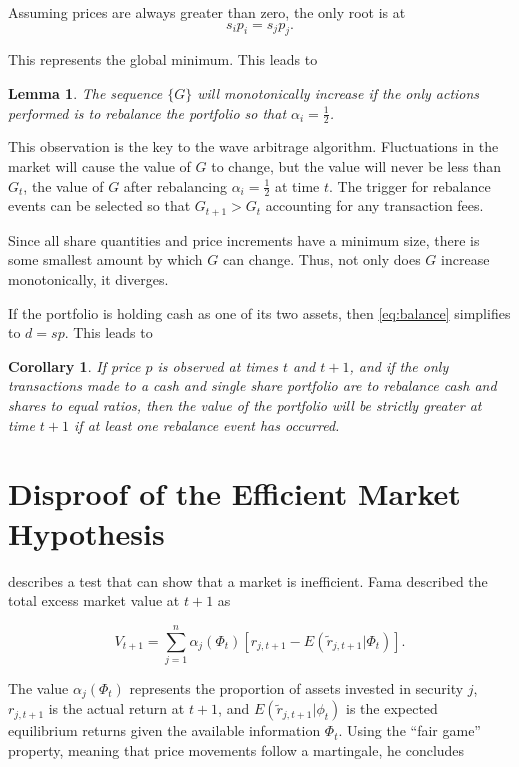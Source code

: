 \documentclass{article}
\newtheorem{corollary}{Corollary}
\newtheorem{lemma}{Lemma}
\begin{document}
Assuming prices are always greater than zero, the only root is at
\begin{equation}
\label{eq:balance}
  s_i p_i = s_j p_j .
\end{equation}

This represents the global minimum. This leads to

\begin{lemma}
\label{lemma}
  The sequence $\{G\}$ will monotonically increase if the only actions performed
  is to rebalance the portfolio so that $\alpha_i = \frac{1}{2}$.
\end{lemma}

This observation is the key to the wave arbitrage algorithm. Fluctuations in the
market will cause the value of $G$ to change, but the value will never be less
than $G_t$, the value of $G$ after rebalancing $\alpha_i = \frac{1}{2}$ at
time $t$. The trigger for rebalance events can be selected so that
$G_{t+1} > G_t$ accounting for any transaction fees.

Since all share quantities and price increments have a minimum size, there is
some smallest amount by which $G$ can change. Thus, not only does $G$ increase
monotonically, it diverges.

If the portfolio is holding cash as one of its two assets, then
\ref{eq:balance} simplifies to $d = s p$. This leads to

\begin{corollary}
  If price $p$ is observed at times $t$ and $t+1$, and if the only
  transactions made to a cash and single share portfolio are to rebalance cash
  and shares to equal ratios, then the value of the portfolio will be strictly
  greater at time $t + 1$ if at least one rebalance event has occurred.
\end{corollary}

\section{Disproof of the Efficient Market Hypothesis}
\label{sec:disproof}

\citet{fama1970} describes a test that can show that a market is
inefficient. Fama described the total excess market value at $t+1$ as

\begin{equation}
  V_{t+1}
    = \sum_{j=1}^n \alpha_j (\Phi_t) [ r_{j,t+1} - E(\tilde{r}_{j,t+1} | \Phi_t)].
\end{equation}

The value $\alpha_j (\Phi_t)$ represents the proportion of assets invested in
security $j$, $r_{j,t+1}$ is the actual return at $t+1$, and
$E(\tilde{r}_{j,t+1} | \phi_t)$ is the expected equilibrium returns given the
available information $\Phi_t$. Using the ``fair game'' property, meaning that price movements follow a martingale, he concludes
\end{document}
